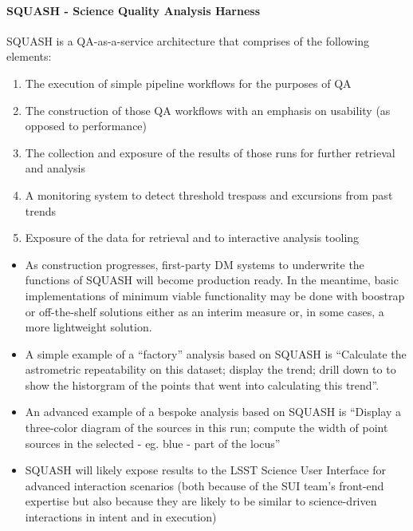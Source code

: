 \paragraph{SQUASH - Science Quality Analysis Harness}
\label{sec:qaSquash}

SQUASH is a QA-as-a-service architecture that comprises of the
following elements:

\begin{enumerate}
\item The execution of simple pipeline workflows for the purposes of QA

\item The construction of those QA workflows with an emphasis on usability (as opposed to performance)

\item The collection and exposure of the results of those runs for further retrieval and analysis

\item A monitoring system to detect threshold trespass and excursions from past trends

\item Exposure of the data for retrieval and to interactive analysis tooling

\end{enumerate}

\begin{itemize}

\item As construction progresses, first-party DM systems to underwrite the functions of SQUASH will become production ready. In the meantime, basic implementations of minimum viable functionality may be done with boostrap or off-the-shelf solutions either as an interim measure or, in some cases, a more lightweight solution. 

\item A simple example of a ``factory'' analysis based on SQUASH is ``Calculate the astrometric repeatability on this dataset; display the trend; drill down to to show the historgram of the points that went into calculating this trend''. 

\item An advanced example of a bespoke analysis based on SQUASH is “Display a three-color diagram of the sources in this run; compute the width of point sources in the selected - eg. blue - part of the locus''

\item SQUASH will likely expose results to the LSST Science User Interface for advanced interaction scenarios (both because of the SUI team's front-end expertise but also because they are likely to be similar to science-driven interactions in intent and in execution)

\end{itemize}



